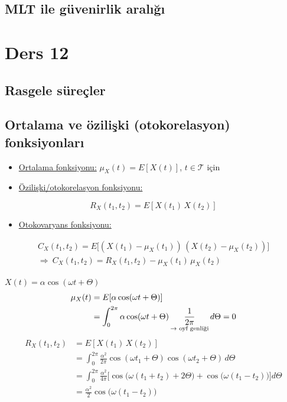 \documentclass[11pt,a4paper]{article}
\begin{document}
\subsection{MLT ile güvenirlik aralığı}

\section{Ders 12}
\subsection{Rasgele süreçler}

\subsection{Ortalama ve özilişki (otokorelasyon) fonksiyonları}
\begin{itemize}
  \item \underline{Ortalama fonksiyonu:} $\mu_X(t)=E[X(t)]$, $t\in\mathcal{T}$ için
  \item \underline{Özilişki/otokorelasyon fonksiyonu:}
\end{itemize}
\[ R_X(t_1,t_2)=E[X(t_1)\,X(t_2)] \]
\begin{itemize}
  \item \underline{Otokovaryans fonksiyonu:}
\end{itemize}
\begin{gather*}
  C_X(t_1,t_2)=E\big[(X(t_1)-\mu_X(t_1))\,(X(t_2)-\mu_X(t_2))\big]\\
  \Rightarrow\ C_X(t_1,t_2)=R_X(t_1,t_2)-\mu_X(t_1)\,\mu_X(t_2)
\end{gather*}
\begin{ornek}
  $X(t)=\alpha\cos(\omega t+\Theta)$
  \begin{align*}
    \mu_X(t) &= E[\alpha\cos(\omega t+\Theta)]\\
    &= \int_{0}^{2\pi}\alpha\cos(\omega t+\Theta)\,\underset{\text{\scriptsize $\to$ oyf genliği}}{\frac{1}{2\pi}}\,d\Theta=0
  \end{align*}
  \begin{align*}
    R_X(t_1,t_2) &= E[X(t_1)\,X(t_2)]\\
    &= \int_{0}^{2\pi}\frac{\alpha^2}{2\pi}\cos(\omega t_1+\Theta)\cos(\omega t_2+\Theta)\,d\Theta\\
    &= \int_{0}^{2\pi}\frac{\alpha^2}{4\pi}\Big[\cos\big(\omega(t_1+t_2)+2\Theta\big)+\cos\big(\omega(t_1-t_2)\big)\Big]d\Theta\\
    &= \frac{\alpha^2}{2}\cos\big(\omega(t_1-t_2)\big)
  \end{align*}
\end{ornek}
\end{document}
